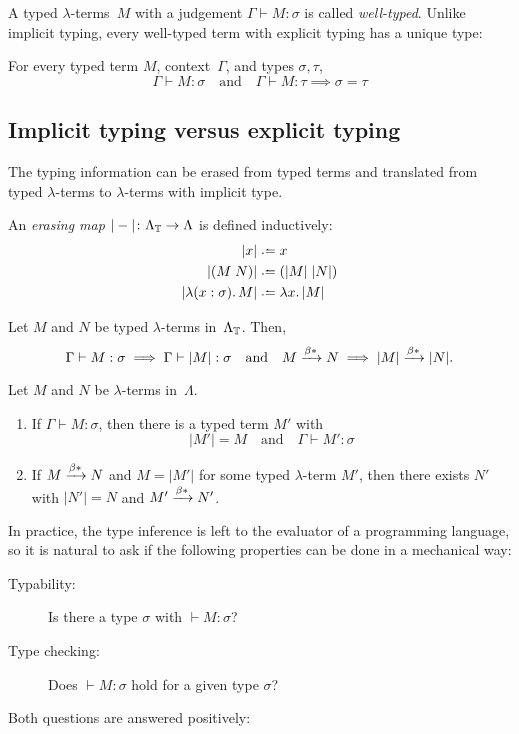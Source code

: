 A typed $\lambda$-terms~$M$ with a judgement $\Gamma \vdash M : \sigma$ is
called \emph{well-typed}.  Unlike implicit typing, every well-typed term with
explicit typing has a unique type:
\begin{proposition}
  For every typed term $M$, context~$\Gamma$, and types $\sigma, \tau$, 
  \[
    \Gamma \vdash M : \sigma
    \quad\text{and}\quad
    \Gamma \vdash M : \tau
    \implies
    \sigma = \tau
  \]
\end{proposition}

\subsection{Implicit typing versus explicit typing}
The typing information can be erased from typed terms and translated
from typed $\lambda$-terms to $\lambda$-terms with implicit type.
\begin{definition}
  An \emph{erasing map} $|-|\colon \Lambda_{\mathbb{T}} \to \Lambda$ is defined
  inductively:
  \begin{align*}
    |x| & \defeq x \\
    |(M\; N)| & \defeq (|M|\;|N|) \\
    |\lambda (x:\sigma).\, M| & \defeq \lambda x.\, |M|
  \end{align*}
\end{definition}
\begin{proposition}
  Let $M$ and $N$ be typed $\lambda$-terms in~$\Lambda_{\mathbb{T}}$. Then, 
  \[
    \Gamma \vdash M : \sigma \implies \Gamma \vdash |M| : \sigma
    \quad\text{and}\quad M \xrightarrow{\beta*} N \implies |M| \xrightarrow{\beta*} |N|.
  \]
\end{proposition}
\begin{proposition}
  Let $M$ and $N$ be $\lambda$-terms in~$\Lambda$. 
  \begin{enumerate}
    \item If $\Gamma \vdash M : \sigma$, then there is a typed term $M'$ with 
      \[
        |M'| = M
        \quad\text{and}\quad
        \Gamma \vdash M' : \sigma
      \]
    \item If $M \xrightarrow{\beta*} N$ and $M = |M'|$ for some typed $\lambda$-term $M'$,
      then there exists $N'$ with $|N'| = N$ and $M' \xrightarrow{\beta*} N'$.
    \end{enumerate}
\end{proposition}

In practice, the type inference is left to the evaluator of a programming
language, so it is natural to ask if the following properties can be done
in a mechanical way:
\begin{description}
  \item[Typability:] Is there a type $\sigma$ with $\vdash M : \sigma$? 
  \item[Type checking:] Does $\vdash M : \sigma$ hold for a given type $\sigma$?
  \end{description}
Both questions are answered positively:

